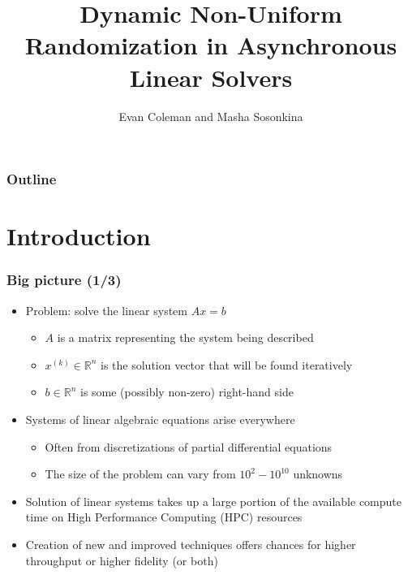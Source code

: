 \documentclass{beamer}
\title[Randomized Asynchronous Linear Solvers]{Dynamic Non-Uniform Randomization in Asynchronous Linear Solvers}
\author[Coleman \& Sosonkina]{Evan Coleman and Masha Sosonkina}
\date{}
\begin{document}
%
\begin{frame}
	\titlepage
\end{frame}


\begin{frame}
	\frametitle{Outline}
	\tableofcontents
\end{frame}

\section{Introduction}

\begin{frame}
	\frametitle{Big picture (1/3)}
	\begin{itemize}
		\item Problem: solve the linear system $Ax = b$
			\begin{itemize}
				\item $A$ is a matrix representing the system being described
				\item $x^{(k)} \in \mathbb{R}^n$ is the solution vector that will be found iteratively
				\item $b \in \mathbb{R}^n$ is some (possibly non-zero) right-hand side
			\end{itemize}
		\item Systems of linear algebraic equations arise everywhere
			\begin{itemize}
				\item Often from discretizations of partial differential equations
				\item The size of the problem can vary from $10^2 - 10^{10}$ unknowns
			\end{itemize}
		\item Solution of linear systems takes up a large portion of the available compute time on High Performance Computing (HPC) resources
		\item Creation of new and improved techniques offers chances for higher throughput or higher fidelity (or both)
	\end{itemize}	
\end{frame}
\end{document}
